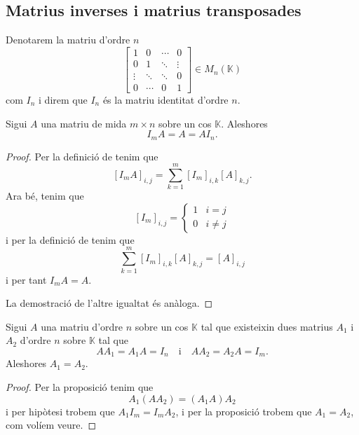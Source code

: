\documentclass[../Apunts.tex]{subfiles}
\begin{document}
	\subsection{Matrius inverses i matrius transposades}
	\begin{notation}
		\label{notation:matriu identitat}
		Denotarem la matriu d'ordre \(n\)
		\[\left[\begin{matrix}
		1 & 0 & \cdots & 0 \\
		0 & 1 & \ddots & \vdots \\
		\vdots & \ddots & \ddots & 0\\
		0 & \cdots & 0 & 1
		\end{matrix}\right]
		\in M_{n}(\mathbb{K})\]
		com \(I_{n}\) i direm que \(I_{n}\) és la matriu identitat d'ordre \(n\).
	\end{notation}
	\begin{proposition}
		\label{prop:producte per la matriu identitat}
		Sigui \(A\) una matriu de mida \(m\times n\) sobre un cos \(\mathbb{K}\). Aleshores
		\[I_{m}A=A=AI_{n}.\]
		\begin{proof}
			Per la definició de  tenim que
			\[[I_{m}A]_{i,j}=\sum_{k=1}^{m}[I_{m}]_{i,k}[A]_{k,j}.\]
			Ara bé, tenim que
			\[[I_{m}]_{i,j}=
			\begin{cases}
			1 & i=j\\
			0 & i\neq j
			\end{cases}\]
			i per la definició de  tenim que
			\[\sum_{k=1}^{m}[I_{m}]_{i,k}[A]_{k,j}=[A]_{i,j}\]
			i per tant \(I_{m}A=A\).
			
			La demostració de l'altre igualtat és anàloga.
		\end{proof}
	\end{proposition}
	\begin{proposition}
		\label{prop:unicitat inverses de matrius pel producte}
		Sigui \(A\) una matriu d'ordre \(n\) sobre un cos \(\mathbb{K}\) tal que existeixin dues matrius \(A_{1}\) i \(A_{2}\) d'ordre \(n\) sobre \(\mathbb{K}\) tal que
		\[AA_{1}=A_{1}A=I_{n}\quad\text{i}\quad AA_{2}=A_{2}A=I_{m}.\]
		Aleshores \(A_{1}=A_{2}\).
		\begin{proof}
			Per la proposició  tenim que
			\[A_{1}(AA_{2})=(A_{1}A)A_{2}\]
			i per hipòtesi trobem que \(A_{1}I_{m}=I_{m}A_{2}\), i per la proposició  trobem que \(A_{1}=A_{2}\), com volíem veure.
		\end{proof}
	\end{proposition}
\end{document}
